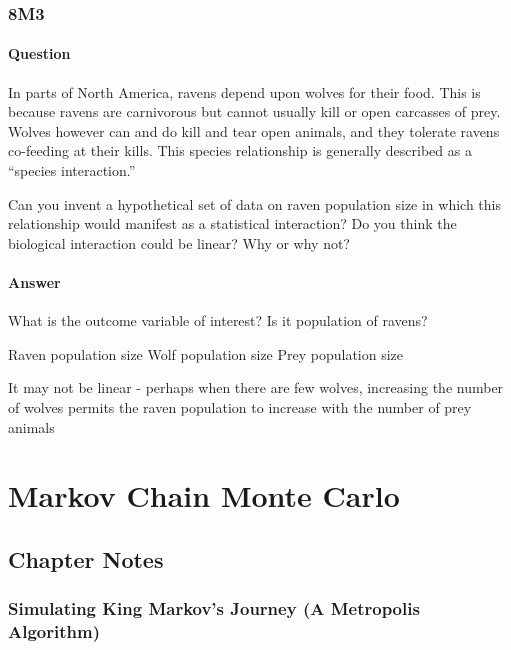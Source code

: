 \documentclass[
]{book}
\begin{document}
\hypertarget{m3-5}{%
\subsection*{8M3}\label{m3-5}}

\hypertarget{question-80}{%
\subsubsection*{Question}\label{question-80}}

In parts of North America, ravens depend upon wolves for their food. This is because ravens are carnivorous but cannot usually kill or open carcasses of prey. Wolves however can and do kill and tear open animals, and they tolerate ravens co-feeding at their kills. This species relationship is generally described as a ``species interaction.''

Can you invent a hypothetical set of data on raven population size in which this relationship would manifest as a statistical interaction? Do you think the biological interaction could be linear? Why or why not?

\hypertarget{answer-80}{%
\subsubsection*{Answer}\label{answer-80}}

What is the outcome variable of interest? Is it population of ravens?

Raven population size
Wolf population size
Prey population size

It may not be linear - perhaps when there are few wolves, increasing the number of wolves permits the raven population to increase with the number of prey animals

\hypertarget{markov_chain}{%
\chapter{Markov Chain Monte Carlo}\label{markov_chain}}

\hypertarget{chapter-notes-8}{%
\section{Chapter Notes}\label{chapter-notes-8}}

\hypertarget{simulating-king-markovs-journey-a-metropolis-algorithm}{%
\subsection*{Simulating King Markov's Journey (A Metropolis Algorithm)}\label{simulating-king-markovs-journey-a-metropolis-algorithm}}
\end{document}
